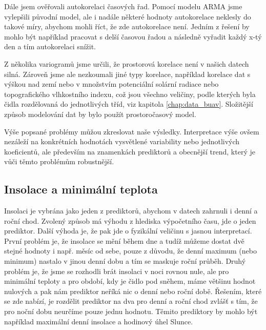 Dále jsem ověřovali autokorelaci časových řad. Pomocí modelu ARMA jsme vylepšili původní model, ale i nadále některé hodnoty autokorelace neklesly do takové míry, abychom mohli říct, že zde autokorelace není. Jedním z řešení by mohlo být například pracovat s delší časovou řadou a následně vyřadit každý x-tý den a tím autokorelaci snížit. 

Z několika variogramů jsme určili, že prostorová korelace není v našich datech silná. Zároveň jsme ale nezkoumali jiné typy korelace, například korelace dat s výškou nad zemí nebo v množstvím potenciální solární radiace nebo topografického vlhkostního indexu, což jsou všechno veličiny, podle kterých byla čidla rozdělovaná do jednotlivých tříd, viz kapitola \ref{chap:data_buav}. Složitější způsob modelování dat by bylo použít prostoročasový model.

Výše popsané problémy můžou zkreslovat naše výsledky. Interpretace výše ovšem nezáleží na konkrétních hodnotách vysvětlené variability nebo jednotlivých koeficientů, ale především na znamenkách prediktorů a obecnější trend, který je vůči těmto problémům robustnější.

\subsection{Insolace a minimální teplota}\label{chap:mintemp_insolation}
Insolaci je vybrána jako jeden z prediktorů, abychom v datech zahrnuli i denní a roční chod. Zvolený způsob má výhodu z hlediska výpočetního času, jde o jeden prediktor. Další výhoda je, že pak jde o fyzikální veličinu s jasnou interpretací. První problém je, že insolace se mění během dne a tudíž můžeme dostat dvě stejné hodnoty i např. měsíc od sebe, pouze z důvodu, že denní maximum (nebo minimum) nastalo v jinou denní dobu a tím se maskuje roční průběh. Druhý problém je, že jsme se rozhodli brát insolaci v noci rovnou nule, ale pro minimální teploty a pro období, kdy je čidlo pod sněhem, máme většinu hodnot nulových a pak nám prediktor neříká nic o denní nebo roční době. Řešením, které se zde nabízí, je rozdělit prediktor na dva pro denní a roční chod zvlášť s tím, že pro noční dobu neurčíme pouze jednu hodnotu. Těmito prediktory by mohlo být například maximální denní insolace a hodinový úhel Slunce.

